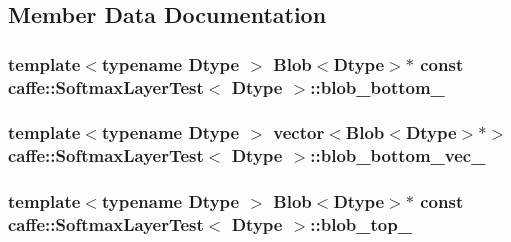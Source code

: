 \subsection{Member Data Documentation}
\hypertarget{classcaffe_1_1_softmax_layer_test_af6ec627c500885a0105e108177d53c29}{
\subsubsection[{blob\+\_\+bottom\+\_\+}]{\setlength{\rightskip}{0pt plus 5cm}template$<$typename Dtype $>$ {\bf Blob}$<$Dtype$>$$\ast$ const {\bf caffe\+::\+Softmax\+Layer\+Test}$<$ Dtype $>$\+::blob\+\_\+bottom\+\_\+\hspace{0.3cm}{\ttfamily [protected]}}}\label{classcaffe_1_1_softmax_layer_test_af6ec627c500885a0105e108177d53c29}
\hypertarget{classcaffe_1_1_softmax_layer_test_a40cb6f5f51ea1017b8f4dd2591dcbdd8}{
\subsubsection[{blob\+\_\+bottom\+\_\+vec\+\_\+}]{\setlength{\rightskip}{0pt plus 5cm}template$<$typename Dtype $>$ vector$<${\bf Blob}$<$Dtype$>$$\ast$$>$ {\bf caffe\+::\+Softmax\+Layer\+Test}$<$ Dtype $>$\+::blob\+\_\+bottom\+\_\+vec\+\_\+\hspace{0.3cm}{\ttfamily [protected]}}}\label{classcaffe_1_1_softmax_layer_test_a40cb6f5f51ea1017b8f4dd2591dcbdd8}
\hypertarget{classcaffe_1_1_softmax_layer_test_a17d658a69bbf19a3db4f1892b1997498}{
\subsubsection[{blob\+\_\+top\+\_\+}]{\setlength{\rightskip}{0pt plus 5cm}template$<$typename Dtype $>$ {\bf Blob}$<$Dtype$>$$\ast$ const {\bf caffe\+::\+Softmax\+Layer\+Test}$<$ Dtype $>$\+::blob\+\_\+top\+\_\+\hspace{0.3cm}{\ttfamily [protected]}}}\label{classcaffe_1_1_softmax_layer_test_a17d658a69bbf19a3db4f1892b1997498}
